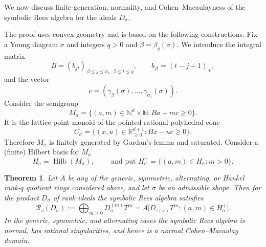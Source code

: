 \documentclass[11pt,reqno]{amsart}
\numberwithin{equation}{subsection}
\newtheorem{theorem}[equation]{Theorem}
\theoremstyle{definition}
\theoremstyle{remark}
\newcommand{\cR}{\mathcal R}
\begin{document}
We now  discuss finite-generation, normality, and Cohen--Macaulayness of the symbolic Rees algebra for the ideals $D_\sigma$. 


The proof uses convex geometry and is based on the following constructions. Fix a Young diagram $\sigma$ and integers $q>0$ and $\beta=\beta_q(\sigma)$. We introduce the integral matrix
\begin{equation}
  B=(b_{jt})_{\,\beta\leq j\leq \sigma_1,\,\beta\leq t\leq q},
  \qquad
  b_{jt}=(t-j+1)_+,
  \label{eq:B-matrix}
\end{equation}
and the vector 
\[
c=(\gamma_{\beta}(\sigma), \ldots, \gamma_{\sigma_1}(\sigma)).
\]
Consider the semigroup
\begin{equation}
  M_\sigma
  =\{(a,m)\in\mathbb{N}^d\times\mathbb{N}:Ba-mc\geq 0\}.
  \label{eq:monoid-M-sigma}
\end{equation}
It is the lattice point monoid of the pointed rational polyhedral cone
\[
  C_\sigma
  =\{(x,u)\in\mathbb{R}_{\geq 0}^{d+1}:Bx-uc\geq 0\}.
\] 
Therefore $M_\sigma$ is finitely generated by Gordan's lemma and saturated. Consider a (finite)  Hilbert basis for $M_\sigma$
\begin{equation}\label{eq: Hsigma}
  H_\sigma=\operatorname{Hilb}(M_\sigma),
  \qquad \text{ and put }
  H_\sigma^+=\{(a,m)\in H_\sigma:m>0\}.
\end{equation}


\begin{theorem}\label{thm:symbolic-rees}
Let $A$ be any of the generic, symmetric, alternating, or Hankel
rank-$q$ quotient rings considered above, and let $\sigma$ be an
admissible shape. Then for  the product $D_\sigma$ of rank ideals the symbolic Rees algebra satisfies
\begin{equation}
 \cR_s(D_\sigma)
 :=\bigoplus_{m\ge0}D_\sigma^{(m)}T^m =A\bigl[D_{\tau(a)}T^m:(a,m)\in H_\sigma^+\bigr].
\end{equation}
In the generic, symmetric, and alternating cases the symbolic Rees algebra is normal, has rational singularities, and hence is a normal Cohen--Macaulay domain. 
\end{theorem}
\end{document}
